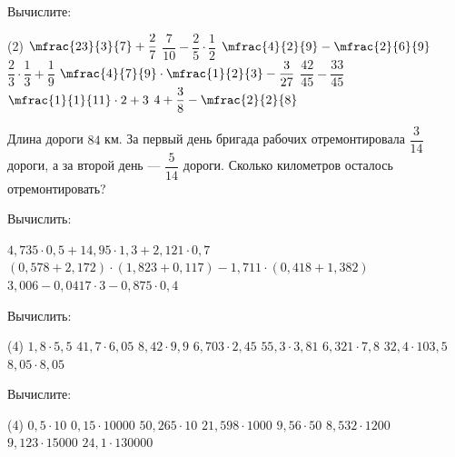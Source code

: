 \begin{homework}[number=3]
	\begin{listofex}
		\item Вычислите:
		\begin{tasks}(2)
			\task \( \mfrac{23}{3}{7}+\dfrac{2}{7} \)
			\task \( \dfrac{7}{10} - \dfrac{2}{5}\cdot\dfrac{1}{2}\)
			\task \( \mfrac{4}{2}{9}-\mfrac{2}{6}{9} \)
			\task \( \dfrac{2}{3}\cdot\dfrac{1}{3}+\dfrac{1}{9} \)
			\task \( \mfrac{4}{7}{9}\cdot\mfrac{1}{2}{3}-\dfrac{3}{27} \)
			\task \( \dfrac{42}{45}-\dfrac{33}{45} \)
			\task \( \mfrac{1}{1}{11}\cdot2+3\)
			\task \( 4+\dfrac{3}{8}-\mfrac{2}{2}{8} \)
		\end{tasks}
		\item Длина дороги \( 84 \) км. За первый день бригада рабочих отремонтировала \(\dfrac{ 3}{14} \) дороги, а за второй день --- \( \dfrac{5}{14} \) дороги. Сколько километров осталось отремонтировать? 
	\end{listofex}
\end{homework}

\begin{class}[number=7]
	\begin{listofex}
		\item Вычислить:
		\begin{tasks}
			\task \( 4,735\cdot0,5+14,95\cdot1,3+2,121\cdot0,7 \)
			\task \( (0,578+2,172)\cdot(1,823+0,117)-1,711\cdot(0,418+1,382) \)
			\task \( 3,006-0,0417\cdot3-0,875\cdot0,4 \)
		\end{tasks}
		\item Вычислить:
		\begin{tasks}(4)
			\task \( 1,8\cdot5,5 \)
			\task \( 41,7\cdot6,05 \)
			\task \( 8,42\cdot9,9 \)
			\task \( 6,703\cdot2,45 \)
			\task \( 55,3\cdot3,81 \)
			\task \( 6,321\cdot7,8 \)
			\task \( 32,4\cdot103,5 \)
			\task \( 8,05\cdot8,05 \)
		\end{tasks}
		\item Вычислите:
		\begin{tasks}(4)
			\task \( 0,5\cdot10 \)
			\task \( 0,15\cdot10000 \)
			\task \( 50,265\cdot10 \)
			\task \( 21,598\cdot1000 \)
			\task \( 9,56\cdot50 \)
			\task \( 8,532\cdot1200 \)
			\task \( 9,123\cdot15000 \)
			\task \( 24,1\cdot130000 \)
		\end{tasks}

	\end{listofex}
\end{class}

